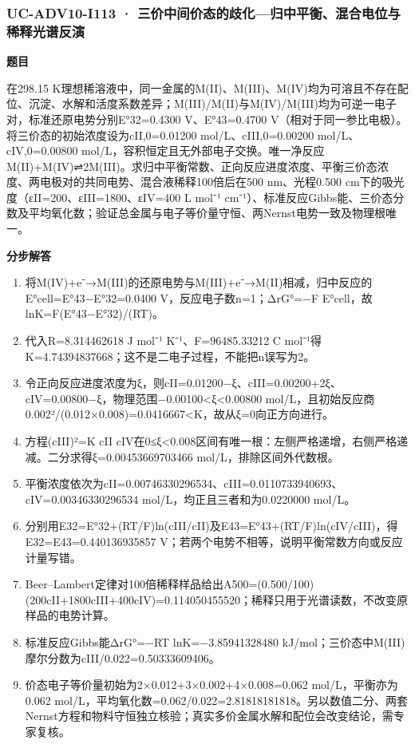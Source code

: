 \documentclass[UTF8,11pt,a4paper]{ctexart}
\begin{document}
\subsubsection*{UC-ADV10-I113 · 三价中间价态的歧化—归中平衡、混合电位与稀释光谱反演}
\noindent\textbf{题目}\par
在298.15 K理想稀溶液中，同一金属的M(II)、M(III)、M(IV)均为可溶且不存在配位、沉淀、水解和活度系数差异；M(III)/M(II)与M(IV)/M(III)均为可逆一电子对，标准还原电势分别E°32=0.4300 V、E°43=0.4700 V（相对于同一参比电极）。将三价态的初始浓度设为cII,0=0.01200 mol/L、cIII,0=0.00200 mol/L、cIV,0=0.00800 mol/L，容积恒定且无外部电子交换。唯一净反应M(II)+M(IV)⇌2M(III)。求归中平衡常数、正向反应进度浓度、平衡三价态浓度、两电极对的共同电势、混合液稀释100倍后在500 nm、光程0.500 cm下的吸光度（εII=200、εIII=1800、εIV=400 L mol⁻¹ cm⁻¹）、标准反应Gibbs能、三价态分数及平均氧化数；验证总金属与电子等价量守恒、两Nernst电势一致及物理根唯一。\par
\medskip\noindent\textbf{分步解答}
\begin{enumerate}
\item 将M(IV)+e⁻→M(III)的还原电势与M(III)+e⁻→M(II)相减，归中反应的E°cell=E°43−E°32=0.0400 V，反应电子数n=1；ΔrG°=−F E°cell，故lnK=F(E°43−E°32)/(RT)。
\item 代入R=8.314462618 J mol⁻¹ K⁻¹、F=96485.33212 C mol⁻¹得K=4.74394837668；这不是二电子过程，不能把n误写为2。
\item 令正向反应进度浓度为ξ，则cII=0.01200−ξ、cIII=0.00200+2ξ、cIV=0.00800−ξ，物理范围−0.00100<ξ<0.00800 mol/L，且初始反应商0.002²/(0.012×0.008)=0.0416667<K，故从ξ=0向正方向进行。
\item 方程(cIII)²=K cII cIV在0≤ξ<0.008区间有唯一根：左侧严格递增，右侧严格递减。二分求得ξ=0.00453669703466 mol/L，排除区间外代数根。
\item 平衡浓度依次为cII=0.00746330296534、cIII=0.0110733940693、cIV=0.00346330296534 mol/L，均正且三者和为0.0220000 mol/L。
\item 分别用E32=E°32+(RT/F)ln(cIII/cII)及E43=E°43+(RT/F)ln(cIV/cIII)，得E32=E43=0.440136935857 V；若两个电势不相等，说明平衡常数方向或反应计量写错。
\item Beer–Lambert定律对100倍稀释样品给出A500=(0.500/100)(200cII+1800cIII+400cIV)=0.114050455520；稀释只用于光谱读数，不改变原样品的电势计算。
\item 标准反应Gibbs能ΔrG°=−RT lnK=−3.85941328480 kJ/mol；三价态中M(III)摩尔分数为cIII/0.022=0.50333609406。
\item 价态电子等价量初始为2×0.012+3×0.002+4×0.008=0.062 mol/L，平衡亦为0.062 mol/L，平均氧化数=0.062/0.022=2.81818181818。另以数值二分、两套Nernst方程和物料守恒独立核验；真实多价金属水解和配位会改变结论，需专家复核。
\end{enumerate}
\end{document}
